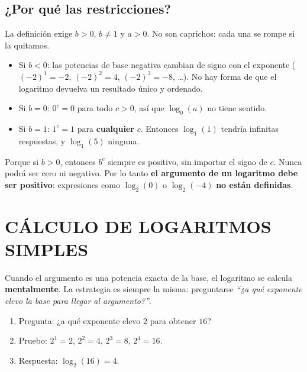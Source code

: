 \documentclass[11pt,a4paper]{article}
\begin{document}
\subsection{¿Por qué las restricciones?}

La definición exige $b > 0$, $b \ne 1$ y $a > 0$. No son caprichos: cada una se rompe si la quitamos.

\begin{tcolorbox}[propiedad, title={Por qué $b > 0$ y $b \ne 1$}]
\begin{itemize}[nosep]
  \item Si $b < 0$: las potencias de base negativa cambian de signo con el exponente ($(-2)^1 = -2$, $(-2)^2 = 4$, $(-2)^3 = -8$, \ldots). No hay forma de que el logaritmo devuelva un resultado único y ordenado.
  \item Si $b = 0$: $0^c = 0$ para todo $c > 0$, así que $\log_0(a)$ no tiene sentido.
  \item Si $b = 1$: $1^c = 1$ para \textbf{cualquier} $c$. Entonces $\log_1(1)$ tendría infinitas respuestas, y $\log_1(5)$ ninguna.
\end{itemize}
\end{tcolorbox}

\begin{tcolorbox}[propiedad, title={Por qué $a > 0$}]
Porque si $b > 0$, entonces $b^c$ siempre es positivo, sin importar el signo de $c$. Nunca podrá ser cero ni negativo. Por lo tanto \textbf{el argumento de un logaritmo debe ser positivo}: expresiones como $\log_2(0)$ o $\log_2(-4)$ \textbf{no están definidas}.
\end{tcolorbox}

\newpage

\section{CÁLCULO DE LOGARITMOS SIMPLES}

Cuando el argumento es una potencia exacta de la base, el logaritmo se calcula \textbf{mentalmente}. La estrategia es siempre la misma: preguntarse \emph{``¿a qué exponente elevo la base para llegar al argumento?''}.

\begin{tcolorbox}[ejemplo, title={Ejemplo paso a paso: $\log_2(16)$}]
\begin{enumerate}[nosep]
  \item Pregunta: ¿a qué exponente elevo $2$ para obtener $16$?
  \item Pruebo: $2^1 = 2$, $2^2 = 4$, $2^3 = 8$, $2^{4} = 16$. \checkmark
  \item Respuesta: $\log_2(16) = 4$.
\end{enumerate}
\end{tcolorbox}
\end{document}
